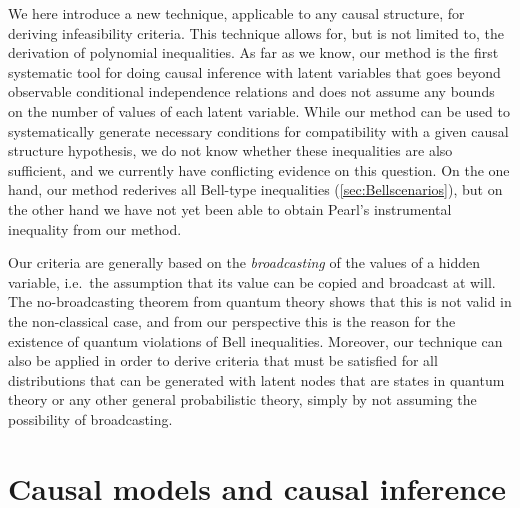 We here introduce a new technique, applicable to any causal structure, for deriving infeasibility criteria. This technique allows for, but is not limited to, the derivation of polynomial inequalities. As far as we know, our method is the first systematic tool for doing causal inference with latent variables that goes beyond observable conditional independence relations and does not assume any bounds on the number of values of each latent variable. While our method can be used to systematically generate necessary conditions for compatibility with a given causal structure hypothesis, we do not know whether these inequalities are also sufficient, and we currently have conflicting evidence on this question. On the one hand, our method rederives all Bell-type inequalities (\cref{sec:Bellscenarios}), but on the other hand we have not yet been able to obtain Pearl's instrumental inequality from our method.

Our criteria are generally based on the \emph{broadcasting} of the values of a hidden variable, i.e.~the assumption that its value can be copied and broadcast at will. The no-broadcasting theorem from quantum theory shows that this is not valid in the non-classical case, and from our perspective this is the reason for the existence of quantum violations of Bell inequalities. Moreover, our technique can also be applied in order to derive criteria that must be satisfied for all distributions that can be generated with latent nodes that are states in quantum theory or any other general probabilistic theory, simply by not assuming the possibility of broadcasting.

\section{Causal models and causal inference}\label{sec:definitions}




